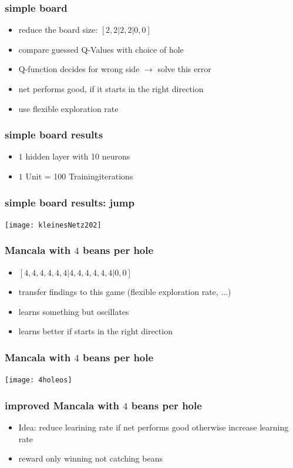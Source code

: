 \documentclass{beamer}
\begin{document}
 \begin{frame}
 \frametitle{simple board}
 \begin{itemize}
\item reduce the board size: $[2,2|2,2|0,0]$
\item compare guessed Q-Values with choice of hole
\item Q-function decides for wrong side $\rightarrow$ solve this error
\item net performs good, if it starts in the right direction
\item use flexible exploration rate
\end{itemize}
 \end{frame}

 \begin{frame}
 \frametitle{simple board results}
\begin{itemize}
\item $1$ hidden layer with 10 neurons
\item $1$ Unit = 100 Trainingiterations
\end{itemize}
 \end{frame}

 \begin{frame}
 \frametitle{simple board results: jump}
 \texttt{[image: kleinesNetz202]}
 \end{frame}

 \begin{frame}
 \frametitle{Mancala with $4$ beans per hole}
 \begin{itemize}
\item  $[4,4,4,4,4,4|4,4,4,4,4,4|0,0]$
\item transfer findings to this game (flexible exploration rate, ...)
\item learns something but oscillates 
\item  learns better if starts in the right direction
\end{itemize}
 \end{frame}

 \begin{frame}
 \frametitle{Mancala with $4$ beans per hole}
 \texttt{[image: 4holeos]}
 \end{frame}

\begin{frame}
\frametitle{improved Mancala with $4$ beans per hole}
\begin{itemize}
\item Idea: reduce learining rate if net performs good otherwise increase learning rate
\item reward only winning not catching beans
\end{itemize}
\end{frame}
\end{document}
